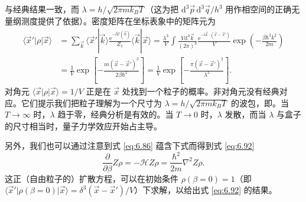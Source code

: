 
与经典结果一致，而 $\lambda=h/\sqrt{2\pi mk_BT}$（这为把 $\mathrm d^3\vec p\,\mathrm d^3\vec q/h^3$ 用作相空间的正确无量纲测度提供了依据）。密度矩阵在坐标表象中的矩阵元为
\begin{equation}\label{eq:6.92}
\begin{aligned}
\langle\vec x'|\rho|\vec x\rangle&=\sum_{\vec k}\langle\vec x'|\vec k\rangle\frac{\mathrm e^{-\beta\mathcal E(\vec k)}}{Z_1}\langle\vec k|\vec x\rangle=\frac{\lambda^3}{V}\int\frac{V\mathrm d^3\vec k}{(2\pi)^3}\frac{\mathrm e^{-\mathrm i\vec k\cdot(\vec x-\vec x')}}{V}\exp\left(-\frac{\beta\hbar^2k^2}{2m}\right)\\
&=\frac1V\exp\left[-\frac{m(\vec x-\vec x')^2}{2\beta\hbar^2}\right]=\frac1V\exp\left[-\frac{\pi(\vec x-\vec x')^2}{\lambda^2}\right].
\end{aligned}
\end{equation}
对角元 $\langle\vec x|\rho|\vec x\rangle=1/V$ 正是在 $\vec x$ 处找到一个粒子的概率。非对角元没有经典对应。它们提示我们把粒子理解为一个尺寸为 $\lambda=h/\sqrt{2\pi mk_BT}$ 的波包，即。当 $T\to\infty$ 时，$\lambda$ 趋于零，经典分析是有效的。当 $T\to0$ 时，$\lambda$ 发散，而当 $\lambda$ 与盒子的尺寸相当时，量子力学效应开始占主导。

另外，我们也可以通过注意到式 \eqref{eq:6.86} 蕴含下式而得到式 \eqref{eq:6.92}
\begin{equation}\label{eq:6.93}
\frac{\partial}{\partial\beta}Z\rho=-\mathscr HZ\rho=\frac{\hbar^2}{2m}\nabla^2Z\rho.
\end{equation}
这正（自由粒子的）扩散方程，可以在初始条件 $\rho(\beta=0)=1$（即 $\langle\vec x'|\rho(\beta=0)|\vec x\rangle=\delta^3(\vec x-\vec x')/V$）下求解，以给出式 \eqref{eq:6.92} 的结果。


